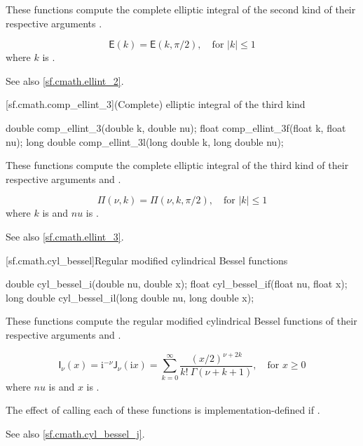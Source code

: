 \begin{itemdescr}

\pnum\effects
These functions compute
the complete elliptic integral of the second kind
of their respective arguments
.

\pnum\returns
\[%
  \mathsf{E}(k) =
  \mathsf{E}(k, \pi / 2),
\quad \mbox{for $|k| \le 1$}
\]
where
$k$ is .

\pnum See also \ref{sf.cmath.ellint_2}.
\end{itemdescr}

[sf.cmath.comp_ellint_3]{(Complete) elliptic integral of the third kind}%
%
%
%
%
%
\begin{itemdecl}
double       comp_ellint_3(double k, double nu);
float        comp_ellint_3f(float k, float nu);
long double  comp_ellint_3l(long double k, long double nu);
\end{itemdecl}

\begin{itemdescr}

\pnum\effects
These functions compute
the complete elliptic integral of the third kind
of their respective arguments
 and .

\pnum\returns
\[%
  \mathsf{\Pi}(\nu, k) = \mathsf{\Pi}(\nu, k, \pi / 2),
		\quad \mbox{for $|k| \le 1$}
\]
where
$k$ is  and
$nu$ is .

\pnum See also \ref{sf.cmath.ellint_3}.
\end{itemdescr}

[sf.cmath.cyl_bessel]{Regular modified cylindrical Bessel functions}%
%
%
%
%
%
\begin{itemdecl}
double       cyl_bessel_i(double nu, double x);
float        cyl_bessel_if(float nu, float x);
long double  cyl_bessel_il(long double nu, long double x);
\end{itemdecl}

\begin{itemdescr}

\pnum\effects
These functions compute
the regular modified cylindrical Bessel functions
of their respective arguments
 and .

\pnum\returns
\[%
  \mathsf{I}_\nu(x) =
  \mathrm{i}^{-\nu} \mathsf{J}_\nu(\mathrm{i}x)
  =
  \sum_{k=0}^\infty \frac{(x/2)^{\nu+2k}}
			 {k! \: \Gamma(\nu+k+1)},
	   \quad \mbox{for $x \ge 0$}
\]
where
$nu$ is  and
$x$ is .

\pnum\remark
The effect of calling each of these functions
is implementation-defined
if .

\pnum See also \ref{sf.cmath.cyl_bessel_j}.
\end{itemdescr}

